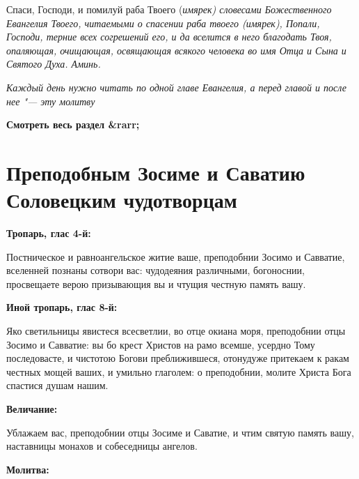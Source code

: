 Спаси, Господи, и помилуй раба Твоего (\itshape имярек\normalfont{}) словесами Божественного Евангелия Твоего, читаемыми о спасении раба твоего (\itshape имярек\normalfont{}), Попали, Господи, терние всех согрешений его, и да вселится в него благодать Твоя, опаляющая, очищающая, освящающая всякого человека во имя Отца и Сына и Святого Духа. Аминь.


\itshape Каждый день нужно читать по одной главе Евангелия, а перед главой и после нее "--- эту молитву\normalfont{}


 


\mychapterending


\bfseries Смотреть весь раздел &rarr;\normalfont{} 

\section{Преподобным Зосиме и Саватию Соловецким чудотворцам}
 


\bfseries Тропарь, глас 4-й:\normalfont{}


Постническое и равноангельское житие ваше, преподобнии Зосимо и Савватие, вселенней познаны сотвори вас: чудодеяния различными, богоноснии, просвещаете верою призывающия вы и чтущия честную память вашу.


\medskip


\bfseries Иной тропарь, глас 8-й:\normalfont{}


Яко светильницы явистеся всесветлии, во отце окиана моря, преподобнии отцы Зосимо и Савватие: вы бо крест Христов на рамо всемше, усердно Тому последовасте, и чистотою Богови преближившеся, отонудуже притекаем к ракам честных мощей ваших, и умильно глаголем: о преподобнии, молите Христа Бога спастися душам нашим.


\medskip


\bfseries Величание:\normalfont{}


Ублажаем вас, преподобнии отцы Зосиме и Саватие, и чтим святую память вашу, наставницы монахов и собеседницы ангелов.


\medskip


\bfseries Молитва:\normalfont{}


